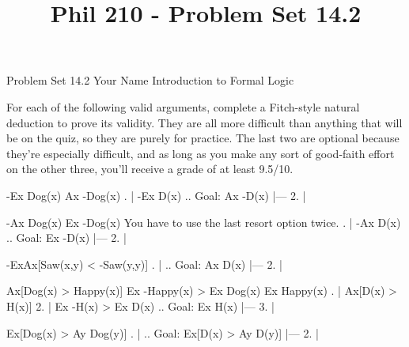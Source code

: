 
\title{Phil 210 - Problem Set 14.2}

\heading
Problem Set 14.2
Your Name
Introduction to Formal Logic
\endheading

For each of the following valid arguments, complete a Fitch-style natural deduction to prove its validity. They are all more difficult than anything that will be on the quiz, so they are purely for practice. The last two are optional because they're especially difficult, and as long as you make any sort of good-faith effort on the other three, you'll receive a grade of at least 9.5/10.

\quantifiers
\problems
{}
\argument
 -Ex Dog(x)
\argumentline
 Ax -Dog(x)
\endargument
        \answer
        . | -Ex D(x)         ..  Goal: Ax -D(x)
            |---
         2. |
        \endfitchproof
        \endanswer

\argument
 -Ax Dog(x)
\argumentline
 Ex -Dog(x)
\endargument
\Hint You have to use the last resort option twice.
        \answer
        . | -Ax D(x)              ..  Goal: Ex -D(x)
            |---
         2. |
        \endfitchproof
        \endanswer

\argument

\argumentline
 -ExAx[Saw(x,y) < -Saw(y,y)]
\endargument
        \answer
        . |                                   ..  Goal: Ax D(x)
            |---
         2. |
        \endfitchproof
        \endanswer

\resetasterisk
\problem{*}
\argument
 Ax[Dog(x) > Happy(x)]
 Ex -Happy(x) > Ex Dog(x)
\argumentline
 Ex Happy(x)
\endargument
        \answer
        . | Ax[D(x) > H(x)]
         2. | Ex -H(x) > Ex D(x)       ..  Goal: Ex H(x)
            |---
         3. |
        \endfitchproof
        \endanswer

\problem{**}
\argument

\argumentline
 Ex[Dog(x) > Ay Dog(y)]
\endargument
        \answer
        . |                                     ..  Goal: Ex[D(x) > Ay D(y)]
            |---
         2. |
        \endfitchproof
        \endanswer

\endproblems
\bye

